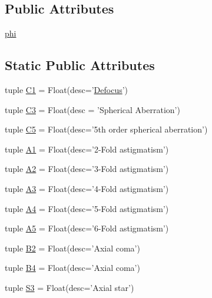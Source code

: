 \subsection*{Public Attributes}
\begin{DoxyCompactItemize}
\item 
\hyperlink{classaberrations_1_1_ab_rose_a9a5a9ba368b3eab2b1920c7e8458b377}{phi}
\end{DoxyCompactItemize}
\subsection*{Static Public Attributes}
\begin{DoxyCompactItemize}
\item 
tuple \hyperlink{classaberrations_1_1_ab_rose_a3eabcef75216755b58bfe2a4c6cd9e11}{C1} = Float(desc='\hyperlink{image_sim_8m_a095451ad095fab975004df8fa1925cb8}{Defocus}')
\item 
tuple \hyperlink{classaberrations_1_1_ab_rose_ad37f4bbe1636b0edd67dcc9506cfba1b}{C3} = Float(desc = 'Spherical Aberration')
\item 
tuple \hyperlink{classaberrations_1_1_ab_rose_a1ecc27f1334f14ce7cde2d79a965db13}{C5} = Float(desc='5th order spherical aberration')
\item 
tuple \hyperlink{classaberrations_1_1_ab_rose_ad3a7ac0dcbe49d6e8c6636d4655d61d7}{A1} = Float(desc='2-\/Fold astigmatism')
\item 
tuple \hyperlink{classaberrations_1_1_ab_rose_a06e49fdcb9afae5e0581fb6d1fac6ed7}{A2} = Float(desc='3-\/Fold astigmatism')
\item 
tuple \hyperlink{classaberrations_1_1_ab_rose_af3a58864fc14fdb8e09c8104313c209e}{A3} = Float(desc='4-\/Fold astigmatism')
\item 
tuple \hyperlink{classaberrations_1_1_ab_rose_a928ea5389201dd3b1212eafd73412774}{A4} = Float(desc='5-\/Fold astigmatism')
\item 
tuple \hyperlink{classaberrations_1_1_ab_rose_a2dfc8dd5fb7d2f8efb0ec57279872043}{A5} = Float(desc='6-\/Fold astigmatism')
\item 
tuple \hyperlink{classaberrations_1_1_ab_rose_a881a1c8d7995ba69d8bd9866678801a3}{B2} = Float(desc='Axial coma')
\item 
tuple \hyperlink{classaberrations_1_1_ab_rose_a00195b5a8abf40ac8636171c7c6c6704}{B4} = Float(desc='Axial coma')
\item 
tuple \hyperlink{classaberrations_1_1_ab_rose_aa7d3824bd8715876ca73e9ac7873d053}{S3} = Float(desc='Axial star')

\end{DoxyCompactItemize}
